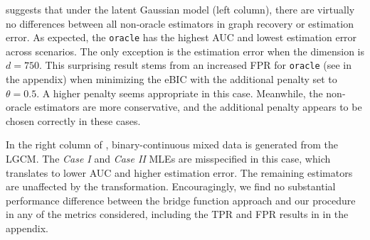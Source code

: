  suggests that under the latent Gaussian model (left column), there are virtually no differences between all non-oracle estimators in graph recovery or estimation error. As expected, the \texttt{oracle} has the highest AUC and lowest estimation error across scenarios. The only exception is the estimation error when the dimension is \(d = 750\). This surprising result stems from an increased FPR for \texttt{oracle} (see  in the appendix) when minimizing the eBIC with the additional penalty set to $\theta = 0.5$. A higher penalty seems appropriate in this case. Meanwhile, the non-oracle estimators are more conservative, and the additional penalty appears to be chosen correctly in these cases.

In the right column of , binary-continuous mixed data is generated from the LGCM. The \textit{Case I} and \textit{Case II} MLEs are misspecified in this case, which translates to lower AUC and higher estimation error.
The remaining estimators are unaffected by the transformation. Encouragingly, we find no substantial performance difference between the bridge function approach and our procedure in any of the metrics considered, including the TPR and FPR results in  in the appendix.

